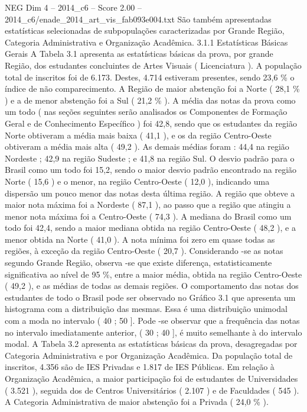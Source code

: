 \begin{textsample}{NEG Dim 4 – 2014\_c6 – Score 2.00 – 2014\_c6/enade\_2014\_art\_vis\_fab093e004.txt}
São também apresentadas estatísticas selecionadas de subpopulações caracterizadas por Grande Região, Categoria Administrativa e Organização Acadêmica. 3.1.1 Estatísticas Básicas Gerais A Tabela 3.1 apresenta as estatísticas básicas da prova, por grande Região, dos estudantes concluintes de Artes Visuais ( Licenciatura ).
A população total de inscritos foi de 6.173.
Destes, 4.714 estiveram presentes, sendo 23,6 \% o índice de não comparecimento.
A Região de maior abstenção foi a Norte ( 28,1 \% ) e a de menor abstenção foi a Sul ( 21,2 \% ).
A média das notas da prova como um todo ( nas seções seguintes serão analisados os Componentes de Formação Geral e de Conhecimento Específico ) foi 42,8, sendo que os estudantes da região Norte obtiveram a média mais baixa ( 41,1 ), e os da região Centro-Oeste obtiveram a média mais alta ( 49,2 ).
As demais médias foram : 44,4 na região Nordeste ; 42,9 na região Sudeste ; e 41,8 na região Sul.
O desvio padrão para o Brasil como um todo foi 15,2, sendo o maior desvio padrão encontrado na região Norte ( 15,6 ) e o menor, na região Centro-Oeste ( 12,0 ), indicando uma dispersão um pouco menor das notas desta última região.
A região que obteve a maior nota máxima foi a Nordeste ( 87,1 ), ao passo que a região que atingiu a menor nota máxima foi a Centro-Oeste ( 74,3 ).
A mediana do Brasil como um todo foi 42,4, sendo a maior mediana obtida na região Centro-Oeste ( 48,2 ), e a menor obtida na Norte ( 41,0 ).
A nota mínima foi zero em quase todas as regiões, à exceção da região Centro-Oeste ( 20,7 ).
Considerando -se as notas segundo Grande Região, observa -se que existe diferença, estatisticamente significativa ao nível de 95 \%, entre a maior média, obtida na região Centro-Oeste ( 49,2 ), e as médias de todas as demais regiões.
O comportamento das notas dos estudantes de todo o Brasil pode ser observado no Gráfico 3.1 que apresenta um histograma com a distribuição das mesmas.
Essa é uma distribuição unimodal com a moda no intervalo ( 40 ; 50 ].
Pode -se observar que a frequência das notas no intervalo imediatamente anterior, ( 30 ; 40 ], é muito semelhante à do intervalo modal.
A Tabela 3.2 apresenta as estatísticas básicas da prova, desagregadas por Categoria Administrativa e por Organização Acadêmica.
Da população total de inscritos, 4.356 são de IES Privadas e 1.817 de IES Públicas.
Em relação à Organização Acadêmica, a maior participação foi de estudantes de Universidades ( 3.521 ), seguida dos de Centros Universitários ( 2.107 ) e de Faculdades ( 545 ).
A Categoria Administrativa de maior abstenção foi a Privada ( 24,0 \% ).

\end{textsample}
